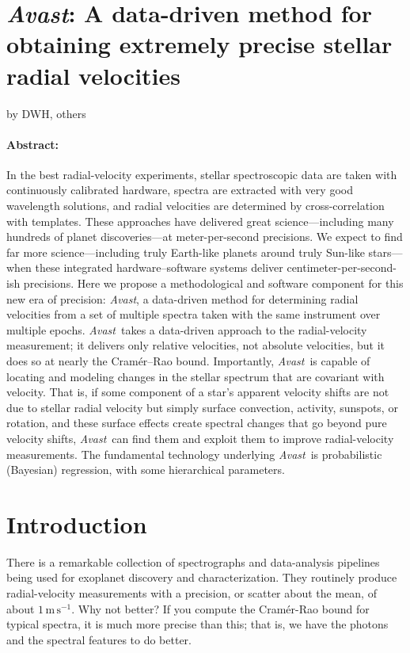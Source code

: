 \documentclass[12pt, letterpaper]{article}
\newcommand{\project}[1]{\textsl{#1}}
\newcommand{\Avast}{\project{Avast}}
\newcommand{\unit}[1]{\mathrm{#1}}
\newcommand{\m}{\unit{m}}
\newcommand{\s}{\unit{s}}
\newcommand{\mps}{\m\,\s^{-1}}
\begin{document}
\section*{\Avast: A data-driven method for obtaining extremely precise stellar radial velocities}

\noindent
by DWH, others

\paragraph{Abstract:}
In the best radial-velocity experiments, stellar
spectroscopic data are taken with continuously calibrated hardware,
spectra are extracted with very good wavelength solutions, and radial
velocities are determined by cross-correlation with templates.
These approaches have delivered great science---including many
hundreds of planet discoveries---at meter-per-second precisions.
We expect to find far more science---including truly Earth-like
planets around truly Sun-like stars---when these integrated
hardware--software systems deliver centimeter-per-second-ish
precisions.
Here we propose a methodological and software component for this new
era of precision: \Avast, a data-driven method for determining
radial velocities from a set of multiple spectra taken with the same
instrument over multiple epochs.
\Avast\ takes a data-driven approach to the radial-velocity
measurement; it delivers only relative velocities, not absolute
velocities, but it does so at nearly the Cram\'er--Rao bound.
Importantly, \Avast\ is capable of locating and modeling changes in
the stellar spectrum that are covariant with velocity.
That is, if some component of a star's apparent velocity shifts are
not due to stellar radial velocity but simply surface convection,
activity, sunspots, or rotation, and these surface effects create
spectral changes that go beyond pure velocity shifts, \Avast\ can find
them and exploit them to improve radial-velocity measurements.
The fundamental technology underlying \Avast\ is probabilistic
(Bayesian) regression, with some hierarchical parameters.

\section{Introduction}

There is a remarkable collection of spectrographs and data-analysis
pipelines being used for exoplanet discovery and characterization.
They routinely produce radial-velocity measurements with a precision,
or scatter about the mean, of about $1\,\mps$.
Why not better?
If you compute the Cram\'er-Rao bound for typical spectra, it is much
more precise than this; that is, we have the photons and the spectral
features to do better.
\end{document}
